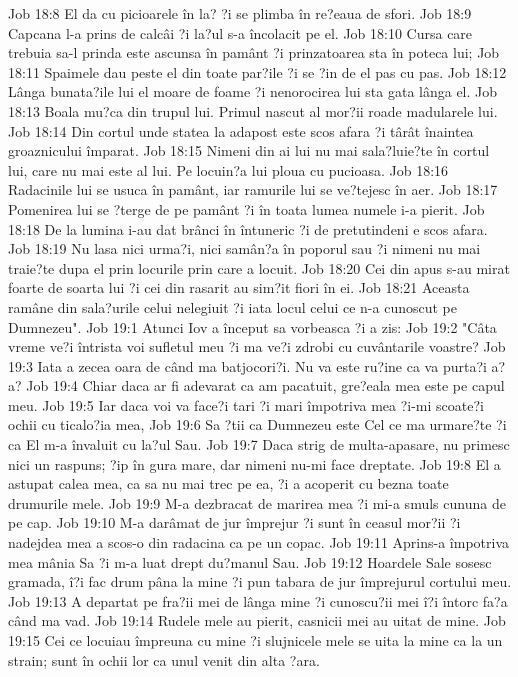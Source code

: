Job 18:8  El da cu picioarele în la? ?i se plimba în re?eaua de sfori.
Job 18:9  Capcana l-a prins de calcâi ?i la?ul s-a încolacit pe el.
Job 18:10  Cursa care trebuia sa-l prinda este ascunsa în pamânt ?i prinzatoarea sta în poteca lui;
Job 18:11  Spaimele dau peste el din toate par?ile ?i se ?in de el pas cu pas.
Job 18:12  Lânga bunata?ile lui el moare de foame ?i nenorocirea lui sta gata lânga el.
Job 18:13  Boala mu?ca din trupul lui. Primul nascut al mor?ii roade madularele lui.
Job 18:14  Din cortul unde statea la adapost este scos afara ?i târât înaintea groaznicului împarat.
Job 18:15  Nimeni din ai lui nu mai sala?luie?te în cortul lui, care nu mai este al lui. Pe locuin?a lui ploua cu pucioasa.
Job 18:16  Radacinile lui se usuca în pamânt, iar ramurile lui se ve?tejesc în aer.
Job 18:17  Pomenirea lui se ?terge de pe pamânt ?i în toata lumea numele i-a pierit.
Job 18:18  De la lumina i-au dat brânci în întuneric ?i de pretutindeni e scos afara.
Job 18:19  Nu lasa nici urma?i, nici samân?a în poporul sau ?i nimeni nu mai traie?te dupa el prin locurile prin care a locuit.
Job 18:20  Cei din apus s-au mirat foarte de soarta lui ?i cei din rasarit au sim?it fiori în ei.
Job 18:21  Aceasta ramâne din sala?urile celui nelegiuit ?i iata locul celui ce n-a cunoscut pe Dumnezeu".
Job 19:1  Atunci Iov a început sa vorbeasca ?i a zis:
Job 19:2  "Câta vreme ve?i întrista voi sufletul meu ?i ma ve?i zdrobi cu cuvântarile voastre?
Job 19:3  Iata a zecea oara de când ma batjocori?i. Nu va este ru?ine ca va purta?i a?a?
Job 19:4  Chiar daca ar fi adevarat ca am pacatuit, gre?eala mea este pe capul meu.
Job 19:5  Iar daca voi va face?i tari ?i mari împotriva mea ?i-mi scoate?i ochii cu ticalo?ia mea,
Job 19:6  Sa ?tii ca Dumnezeu este Cel ce ma urmare?te ?i ca El m-a învaluit cu la?ul Sau.
Job 19:7  Daca strig de multa-apasare, nu primesc nici un raspuns; ?ip în gura mare, dar nimeni nu-mi face dreptate.
Job 19:8  El a astupat calea mea, ca sa nu mai trec pe ea, ?i a acoperit cu bezna toate drumurile mele.
Job 19:9  M-a dezbracat de marirea mea ?i mi-a smuls cununa de pe cap.
Job 19:10  M-a darâmat de jur împrejur ?i sunt în ceasul mor?ii ?i nadejdea mea a scos-o din radacina ca pe un copac.
Job 19:11  Aprins-a împotriva mea mânia Sa ?i m-a luat drept du?manul Sau.
Job 19:12  Hoardele Sale sosesc gramada, î?i fac drum pâna la mine ?i pun tabara de jur împrejurul cortului meu.
Job 19:13  A departat pe fra?ii mei de lânga mine ?i cunoscu?ii mei î?i întorc fa?a când ma vad.
Job 19:14  Rudele mele au pierit, casnicii mei au uitat de mine.
Job 19:15  Cei ce locuiau împreuna cu mine ?i slujnicele mele se uita la mine ca la un strain; sunt în ochii lor ca unul venit din alta ?ara.
